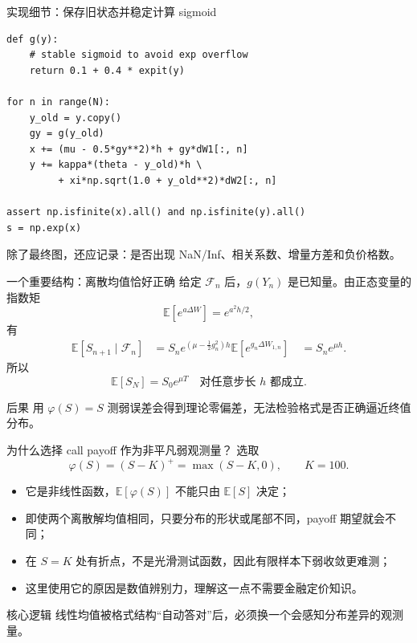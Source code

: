 \documentclass[aspectratio=169,10pt,fontset=none]{ctexbeamer}
\newcommand{\E}{\mathbb{E}}
\begin{document}
\begin{frame}[fragile]{实现细节：保存旧状态并稳定计算 sigmoid}
\begin{lstlisting}
def g(y):
    # stable sigmoid to avoid exp overflow
    return 0.1 + 0.4 * expit(y)

for n in range(N):
    y_old = y.copy()
    gy = g(y_old)
    x += (mu - 0.5*gy**2)*h + gy*dW1[:, n]
    y += kappa*(theta - y_old)*h \
         + xi*np.sqrt(1.0 + y_old**2)*dW2[:, n]

assert np.isfinite(x).all() and np.isfinite(y).all()
s = np.exp(x)
\end{lstlisting}
  \vspace{-0.4em}
  \small 除了最终图，还应记录：是否出现 NaN/Inf、相关系数、增量方差和负价格数。
\end{frame}

\begin{frame}{一个重要结构：离散均值恰好正确}
  给定 $\mathcal F_n$ 后，$g(Y_n)$ 是已知量。由正态变量的指数矩
  \[
    \E[e^{a\Delta W}]=e^{a^2h/2},
  \]
  有
  \begin{align*}
    \E[S_{n+1}\mid\mathcal F_n]
      &=S_ne^{(\mu-\frac12g_n^2)h}
        \E[e^{g_n\Delta W_{1,n}}]\
      &=S_ne^{\mu h}.
  \end{align*}
  所以
  \[
    \boxed{\E[S_N]=S_0e^{\mu T}\quad\text{对任意步长 }h\text{ 都成立}.}
  \]
  \begin{alertblock}{后果}
    用 $\varphi(S)=S$ 测弱误差会得到理论零偏差，无法检验格式是否正确逼近终值分布。
  \end{alertblock}
\end{frame}

\begin{frame}{为什么选择 call payoff 作为非平凡弱观测量？}
  选取
  \[
    \varphi(S)=(S-K)^+=\max(S-K,0),\qquad K=100.
  \]
  \begin{itemize}
    \item 它是非线性函数，$\E[\varphi(S)]$ 不能只由 $\E[S]$ 决定；
    \item 即使两个离散解均值相同，只要分布的形状或尾部不同，payoff 期望就会不同；
    \item 在 $S=K$ 处有折点，不是光滑测试函数，因此有限样本下弱收敛更难测；
    \item 这里使用它的原因是\alert{数值辨别力}，理解这一点不需要金融定价知识。
  \end{itemize}
  \begin{block}{核心逻辑}
    线性均值被格式结构“自动答对”后，必须换一个会感知分布差异的观测量。
  \end{block}
\end{frame}
\end{document}

